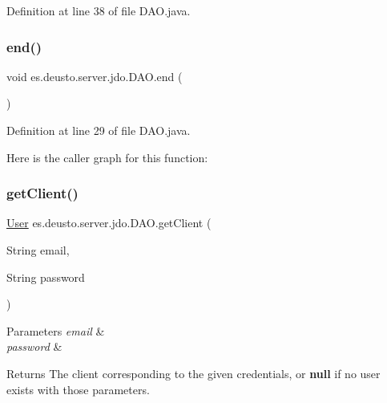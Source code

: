 Definition at line 38 of file D\+A\+O.\+java.

\mbox{\label{classes_1_1deusto_1_1server_1_1jdo_1_1_d_a_o_a376574d8ad006d0bad98e39172b67847}} 
\subsubsection{\texorpdfstring{end()}{end()}}
{\footnotesize\ttfamily void es.\+deusto.\+server.\+jdo.\+D\+A\+O.\+end (\begin{DoxyParamCaption}{ }\end{DoxyParamCaption})}



Definition at line 29 of file D\+A\+O.\+java.

Here is the caller graph for this function\+:
\mbox{\label{classes_1_1deusto_1_1server_1_1jdo_1_1_d_a_o_a340f51843de8957e9ef8b0c95081512a}} 
\subsubsection{\texorpdfstring{getClient()}{getClient()}}
{\footnotesize\ttfamily \mbox{\hyperlink{classes_1_1deusto_1_1server_1_1jdo_1_1_user}{User}} es.\+deusto.\+server.\+jdo.\+D\+A\+O.\+get\+Client (\begin{DoxyParamCaption}\item[{String}]{email,  }\item[{String}]{password }\end{DoxyParamCaption})}


\begin{DoxyParams}{Parameters}
{\em email} & \\
\hline
{\em password} & \\
\hline
\end{DoxyParams}
\begin{DoxyReturn}{Returns}
The client corresponding to the given credentials, or {\bfseries{null}} if no user exists with those parameters. 
\end{DoxyReturn}


